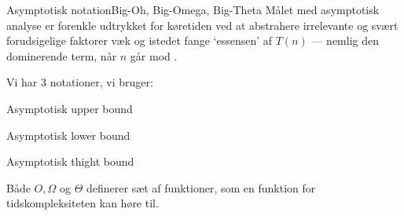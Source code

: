 \documentclass{beamer}
\begin{document}
\begin{frame}{Asymptotisk notation}{Big-Oh, Big-Omega, Big-Theta}
    Målet med asymptotisk analyse er forenkle udtrykket for køretiden ved at
    abstrahere irrelevante og svært forudsigelige faktorer væk og istedet fange
    `essensen' af $T(n)$ --- nemlig den dominerende term, når $n$ går mod
    \infty.

    \pause
    \medskip

    Vi har 3 notationer, vi bruger:

    \begin{description}
        \item[Big-Oh, $O$] Asymptotisk \alert{upper bound}
        \item[Big-Omega, $\Omega$] Asymptotisk \alert{lower bound}
        \item[Big-Theta, $\Theta$] Asymptotisk \alert{thight bound}
    \end{description}

    Både $O, \Omega$ og $\Theta$ definerer \alert{sæt af funktioner}, som en
    funktion for tidskompleksiteten kan høre til.
\end{frame}
\end{document}

